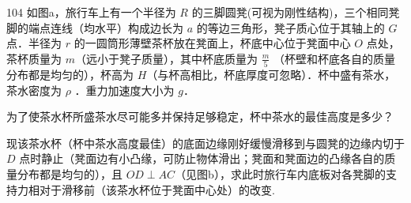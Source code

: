 \begin{problem}[2019年第36届全国中学生物理竞赛复赛][旅行车圆凳茶杯稳定问题]{104}
如图a，旅行车上有一个半径为 $R$ 的三脚圆凳(可视为刚性结构)，三个相同凳脚的端点连线（均水平）构成边长为 $a$ 的等边三角形，凳子质心位于其轴上的 $G$ 点．半径为 $r$ 的一圆筒形薄壁茶杯放在凳面上，杯底中心位于凳面中心 $O$ 点处，茶杯质量为 $m$（远小于凳子质量），其中杯底质量为 $\frac{m}{5}$ （杯壁和杯底各自的质量分布都是均匀的），杯高为 $H$（与杯高相比，杯底厚度可忽略）．杯中盛有茶水，茶水密度为 $\rho$ ．重力加速度大小为 $g$．
\begin{subproblem}
为了使茶水杯所盛茶水尽可能多并保持足够稳定，杯中茶水的最佳高度是多少？
\end{subproblem}
\begin{subproblem}
现该茶水杯（杯中茶水高度最佳）的底面边缘刚好缓慢滑移到与圆凳的边缘内切于 $D$ 点时静止（凳面边有小凸缘，可防止物体滑出；凳面和凳面边的凸缘各自的质量分布都是均匀的），且 $OD\perp AC$（见图b），求此时旅行车内底板对各凳脚的支持力相对于滑移前（该茶水杯位于凳面中心处）的改变.
\end{subproblem}
\end{problem}